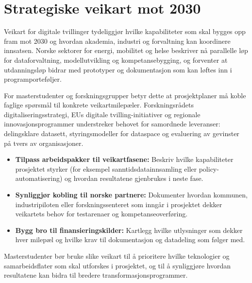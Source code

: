 \section{Strategiske veikart mot 2030}
Veikart for digitale tvillinger tydeliggjør hvilke kapabiliteter som skal bygges opp fram mot 2030 og hvordan akademia, industri og forvaltning kan koordinere innsatsen.\citep{rcn2023veikart,eu2024digitaltwinroadmap} Norske sektorer for energi, mobilitet og helse beskriver nå parallelle løp for dataforvaltning, modellutvikling og kompetansebygging, og forventer at utdanningsløp bidrar med prototyper og dokumentasjon som kan løftes inn i programporteføljer.

For masterstudenter og forskningsgrupper betyr dette at prosjektplaner må koble faglige spørsmål til konkrete veikartmilepæler. Forskningsrådets digitaliseringsstrategi, EUs digitale tvilling-initiativer og regionale innovasjonsprogrammer understreker behovet for samordnede leveranser: delingsklare datasett, styringsmodeller for dataspace og evaluering av gevinster på tvers av organisasjoner.\citep{rcn2023veikart,rcn2024digitalisering}

\begin{itemize}
    \item \textbf{Tilpass arbeidspakker til veikartfasene:} Beskriv hvilke kapabiliteter prosjektet styrker (for eksempel sanntidsdatainnsamling eller policy-automatisering) og hvordan resultatene gjenbrukes i neste fase.
    \item \textbf{Synliggjør kobling til norske partnere:} Dokumenter hvordan kommunen, industripiloten eller forskningssenteret som inngår i prosjektet dekker veikartets behov for testarenaer og kompetanseoverføring.
    \item \textbf{Bygg bro til finansieringskilder:} Kartlegg hvilke utlysninger som dekker hver milepæl og hvilke krav til dokumentasjon og datadeling som følger med.
\end{itemize}

Masterstudenter bør bruke slike veikart til å prioritere hvilke teknologier og samarbeidsflater som skal utforskes i prosjektet, og til å synliggjøre hvordan resultatene kan bidra til bredere transformasjonsprogrammer.


